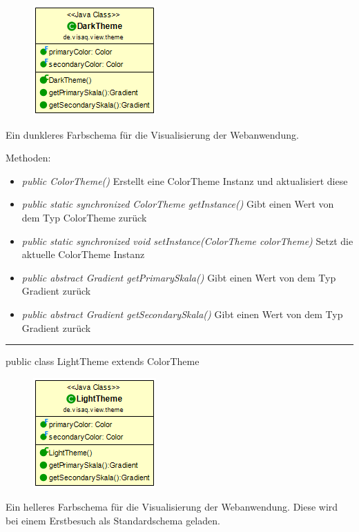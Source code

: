 \begin{minipage}{0.3\textwidth}
    \begin{figure}[H]
        \includegraphics[scale = 0.5]{media/frontend/view/de.view.elements.theme/DarkTheme_Class.png}
    \end{figure}
    \end{minipage} \hfill
    \begin{minipage}{0.6\textwidth}
       Ein dunkleres Farbschema für die Visualisierung der Webanwendung.
    \end{minipage}

Methoden:
\begin{itemize}
    \item \emph{public ColorTheme()} Erstellt eine ColorTheme Instanz und aktualisiert diese
    \item \emph{public static synchronized ColorTheme getInstance()} Gibt einen Wert von dem Typ ColorTheme zurück
    \item \emph{public static synchronized void setInstance(ColorTheme colorTheme)} Setzt die aktuelle ColorTheme Instanz
    \item \emph{public abstract Gradient getPrimarySkala()} Gibt einen Wert von dem Typ Gradient zurück
    \item \emph{public abstract Gradient getSecondarySkala()} Gibt einen Wert von dem Typ Gradient zurück
\end{itemize}

\rule{\textwidth}{0.4pt}
public class LightTheme extends ColorTheme

\begin{minipage}{0.3\textwidth}
    \begin{figure}[H]
        \includegraphics[scale = 0.5]{media/frontend/view/de.view.elements.theme/LightTheme_Class.png}
    \end{figure}
    \end{minipage} \hfill
    \begin{minipage}{0.6\textwidth}
        Ein helleres Farbschema für die Visualisierung der Webanwendung. Diese wird bei einem Erstbesuch als Standardschema geladen.
    \end{minipage}

